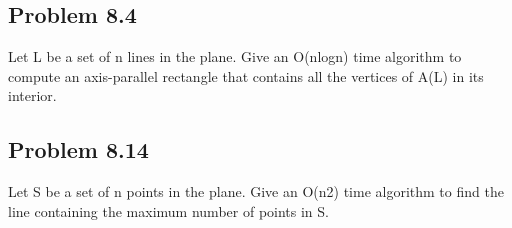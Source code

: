 \documentclass[11pt,psfig]{article}
\begin{document}
\subsection*{Problem 8.4}

Let L be a set of n lines in the plane. Give an O(nlogn) time algorithm to
compute an axis-parallel rectangle that contains all the vertices of A(L)
in its interior.


\subsection*{Problem 8.14}

Let S be a set of n points in the plane. Give an O(n2) time algorithm to
find the line containing the maximum number of points in S.


\end{document}
